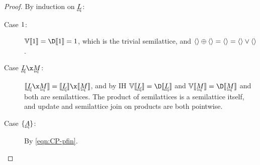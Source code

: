 \documentclass{rntz}\usepackage{fantasy}%
\begin{document}


\lemEqsemi*
\begin{proof}\label{proof:eqsemi}
  By induction on $\eqt L$:

  \begin{description}
  \item[Case $1$:] \(\vals{\den \tunit} = \chgs{\den \tunit} = \termO\),
    which is the trivial semilattice, and \(\langle{}\rangle \mathbin{\oplus} \langle{}\rangle = \langle{}\rangle
    = \langle{}\rangle \vee \langle{}\rangle\).

  \item[Case $\eqt L \x \eqt M$:] \(\den{\eqt L \x \eqt M} = \den{\eqt L} \x
    \den{\eqt M}\), and by IH $\vals{\den{\eqt L}} = \chgs{\den{\eqt L}}$ and
    \(\vals{\den{\eqt M}} = \chgs{\den{\eqt M}}\) and both are semilattices. The
    product of semilattices is a semilattice itself, and update and semilattice
    join on products are both pointwise.

  \item[Case $\tseteq A$:] By \cref{eqn:CP-pfin}.
  \end{description}
\end{proof}
\end{document}

